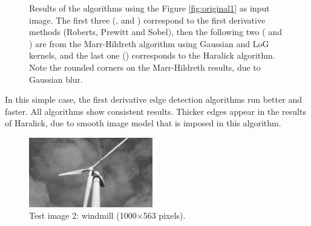 \documentclass{ipol}
\numberwithin{equation}{section}
\numberwithin{table}{section}
\begin{document}
{\begin{figure}[h!]
	\quad
	\quad
	\caption{Results of the algorithms using the Figure \ref{fig:original1} as input image. The first three (,  and ) correspond to the first derivative methods (Roberts, Prewitt and Sobel), then the following two ( and ) are from the Marr-Hildreth algorithm using Gaussian and LoG kernels, and the last one () corresponds to the Haralick algorithm. Note the rounded corners on the Marr-Hildreth results, due to Gaussian blur.}
	\label{fig:result1}
\end{figure}

In this simple case, the first derivative edge detection algorithms run better and faster. All algorithms show consistent results. Thicker edges appear in the results of Haralick, due to smooth image model that is imposed in this algorithm. 

\begin{figure}[t!]
	\centering
	\includegraphics[width=0.48\textwidth]{results/molino_bw.png}
	\caption{Test image 2: windmill (1000$\times$563 pixels).}
	\label{fig:original2}
\end{figure}

}
\end{document}
